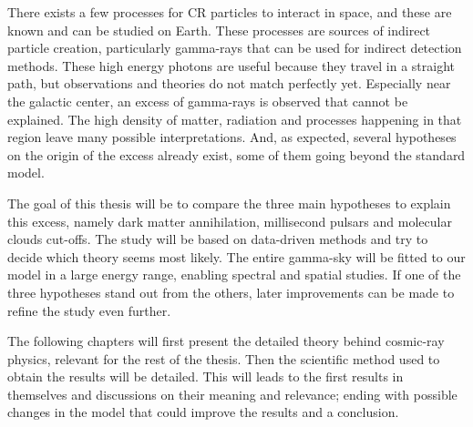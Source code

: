There exists a few processes for CR particles to interact in space, and these are known and can be studied on Earth. These processes are sources of indirect particle creation, particularly gamma-rays that can be used for indirect detection methods. These high energy photons are useful because they travel in a straight path, but observations and theories do not match perfectly yet. Especially near the galactic center, an excess of gamma-rays is observed that cannot be explained. The high density of matter, radiation and processes happening in that region leave many possible interpretations. And, as expected, several hypotheses on the origin of the excess already exist, some of them going beyond the standard model.

The goal of this thesis will be to compare the three main hypotheses to explain this excess, namely dark matter annihilation, millisecond pulsars and molecular clouds cut-offs. The study will be based on data-driven methods and try to decide which theory seems most likely. The entire gamma-sky will be fitted to our model in a large energy range, enabling spectral and spatial studies. If one of the three hypotheses stand out from the others, later improvements can be made to refine the study even further.

The following chapters will first present the detailed theory behind cosmic-ray physics, relevant for the rest of the thesis. Then the scientific method used to obtain the results will be detailed. This will leads to the first results in themselves and discussions on their meaning and relevance; ending with possible changes in the model that could improve the results and a conclusion.


	
	



